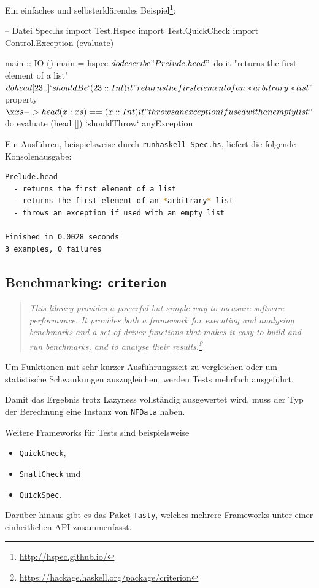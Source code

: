 Ein einfaches und selbsterklärendes
Beispiel\footnote{\url{http://hspec.github.io/}}:
\begin{hcode}
-- Datei Spec.hs
import Test.Hspec
import Test.QuickCheck
import Control.Exception (evaluate)

main :: IO ()
main = hspec $ do
  describe "Prelude.head" $ do
    it "returns the first element of a list" $ do
      head [23 ..] `shouldBe` (23 :: Int)

    it "returns the first element of an *arbitrary* list" $
      property $ \x xs -> head (x:xs) == (x :: Int)

    it "throws an exception if used with an empty list" $ do
      evaluate (head []) `shouldThrow` anyException
\end{hcode}
Ein Ausführen, beispielsweise durch \texttt{runhaskell Spec.hs},
liefert die folgende Konsolenausgabe:
\begin{lstlisting}[language=bash 
                  ,numbers=none
                  ,frame=L]
Prelude.head
  - returns the first element of a list
  - returns the first element of an *arbitrary* list
  - throws an exception if used with an empty list

Finished in 0.0028 seconds
3 examples, 0 failures
\end{lstlisting}

\subsection{Benchmarking: \texttt{criterion}}
\begin{quote}\itshape
  This library provides a powerful but simple way to measure software
  performance. It provides both a framework for executing and analysing
  benchmarks and a set of driver functions that makes it easy to build and run
  benchmarks, and to analyse their
  results.\footnote{\url{https://hackage.haskell.org/package/criterion}}
\end{quote}
Um Funktionen mit sehr kurzer Ausführungszeit zu vergleichen oder um
statistische Schwankungen auszugleichen, werden Tests mehrfach ausgeführt.

Damit das Ergebnis trotz Lazyness vollständig ausgewertet wird, muss der Typ
der Berechnung eine Instanz von \texttt{NFData} haben.

Weitere Frameworks für Tests sind beispielsweise
\begin{itemize}
  \item \texttt{QuickCheck},
  \item \texttt{SmallCheck} und
  \item \texttt{QuickSpec}.
\end{itemize}
Darüber hinaus gibt es das Paket \texttt{Tasty}, welches mehrere Frameworks 
unter einer einheitlichen API zusammenfasst.

